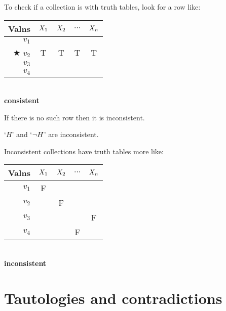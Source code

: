 \begin{highlighted}
		To check if a collection is  with truth tables, look for a row like:
	
	
	\smallskip 
	\begin{center}
				\begin{tabular}{r || c |c |c | c}
					Valns & $X_1$ & $X_2$ & $\cdots$ & $X_n$\\
					\hline
					$v_1$&&&&\\
					$\bigstar$ $v_2$  & T & T & T & {T} \\
					$v_3$&&&&\\
					$v_4$&&&&
				\end{tabular}\\ \textbf{consistent}
\end{center}

If there is no such row then it is inconsistent. 
	
	
\end{highlighted}

`$H$' and `$\neg H$' are inconsistent. 

Inconsistent collections have truth tables more like: 
	\begin{center}
		\begin{tabular}{r || c |c |c | c}
			Valns & $X_1$ & $X_2$ & $\cdots$ & $X_n$\\
			\hline
			$v_1$&F&&&\\
			$v_2$  &&F&& \\
			$v_3$&&&&F\\
			$v_4$&&&F&
		\end{tabular}\\ \textbf{inconsistent}
	\end{center}




\section{Tautologies and contradictions}\label{s:TautologiesAndContradictions}

